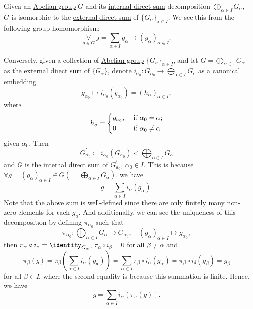 \begin{remark}\label{rmk:relation-between-internal-and-externam-direct-sum}
	Given an \hyperref[def:Abelian-group]{Abelian group} \(G\) and its \hyperref[def:internal-direct-sum]{internal direct sum} decomposition \(\bigoplus_{\alpha \in I}G_\alpha \),
	\(G\) is isomorphic to the \hyperref[def:external-direct-sum]{external direct sum} of \(\{G_\alpha \}_{\alpha \in I}\). We see this from the following group homomorphism:
	\[
		\underset{g\in G}{\forall }\ g = \sum\limits_{\alpha \in I}g_\alpha \mapsto (g_\alpha )_{\alpha \in I}.
	\]

	Conversely, given a collection of \hyperref[def:Abelian-group]{Abelian group} \(\{G_\alpha \}_{\alpha \in I}\), and let \(G = \bigoplus_{\alpha \in I}G_\alpha \) as the
	\hyperref[def:external-direct-sum]{external direct sum} of \(\{G_\alpha \}\), denote
	\(i_{\alpha_0 }\colon G_{\alpha_0} \to \bigoplus_{\alpha \in I}G_\alpha\)
	as a canonical embedding
	\[
		g_{ \alpha_0 }\mapsto i_{ \alpha_0 } (g_{ \alpha_0 }) = (h_\alpha)_{\alpha\in I},
	\]
	where
	\[
		h_\alpha  = \begin{dcases}
			g_{ \alpha_0 }, & \text{ if } \alpha_0 = \alpha  ; \\
			0,              & \text{ if } \alpha_0 \neq \alpha
		\end{dcases}
	\]
	given \(\alpha_0\). Then
	\[
		G_{\alpha_0} ^\prime \coloneqq i_{\alpha_0} (G_{\alpha_0}) < \bigoplus _{\alpha \in I}G_\alpha
	\]
	and \(G\) is the \hyperref[def:internal-direct-sum]{internal direct sum} of \(G^\prime _{\alpha_0} \), \(\alpha_0\in I\). This is because
	\(\forall g= (g_\alpha )_{\alpha \in I}\in G(= \bigoplus_{\alpha \in I}G_\alpha )\), we have
	\[
		g = \sum\limits_{\alpha \in I} i_\alpha (g_\alpha ).
	\]
	Note that the above sum is well-defined since there are only finitely many non-zero elements for each \(g_\alpha \). And additionally, we can
	see the uniqueness of this decomposition by defining \(\pi _{\alpha_0} \) such that
	\[
		\pi _{\alpha_0} \colon \bigoplus_{\alpha \in I}G_\alpha \to G_{\alpha_0} , \quad (g_\alpha )_{\alpha \in I}\mapsto g_{\alpha_0} ,
	\]
	then \(\pi _\alpha \circ i_\alpha = \identity_{G_\alpha } \), \(\pi _\alpha \circ i_\beta = 0\) for all \(\beta \neq \alpha \) and
	\[
		\pi _\beta (g) = \pi _\beta \left(\sum\limits_{\alpha \in I}^{}i_\alpha (g_\alpha ) \right) = \sum\limits_{\alpha \in I}\pi _\beta \circ i_\alpha (g_\alpha ) = \pi _\beta \circ i_\beta (g_\beta ) = g_\beta
	\]
	for all \(\beta \in I\), where the second equality is because this summation is finite. Hence, we have
	\[
		g = \sum\limits_{\alpha \in I}i_\alpha (\pi _\alpha (g)).
	\]
\end{remark}

